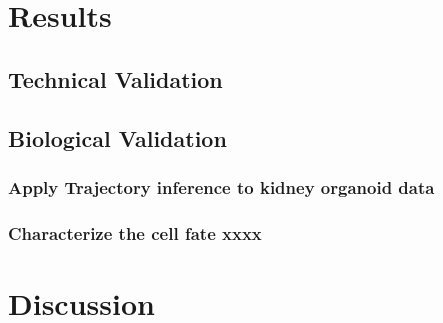 \section{Results}
\subsection{Technical Validation}
\subsection{Biological Validation}
\subsubsection{Apply Trajectory inference to kidney organoid data}
\subsubsection{Characterize the cell fate xxxx}
\section{Discussion}

